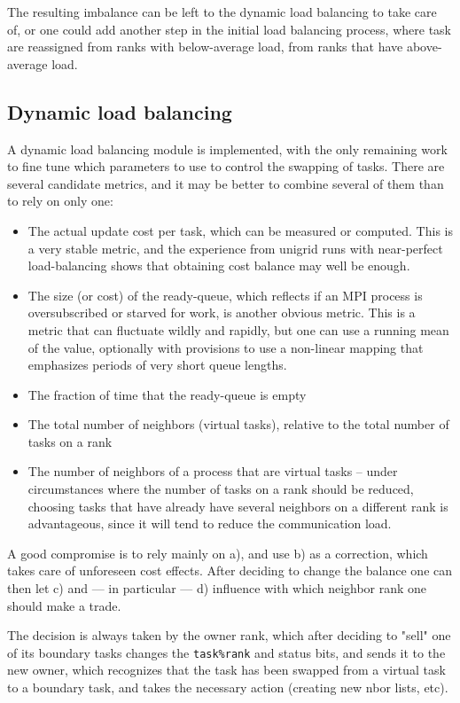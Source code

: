 \documentclass[paper=a4,fontsize=11pt]{scrartcl}
\numberwithin{equation}{section}		%
\numberwithin{figure}{section}			%
\numberwithin{table}{section}				%
\newcommand{\codecolor}{\color{Blue}}
\newcommand{\Code}[1]{{\codecolor\texttt{#1}}}
\begin{document}
The resulting imbalance can be left to the dynamic load balancing to take care of, or one could add another step in the initial load balancing process, where task are reassigned from ranks with below-average load, from ranks that have above-average load.

\subsection{Dynamic load balancing}
A dynamic load balancing module is implemented, with the only remaining work to fine tune which parameters to use to control the swapping of tasks.  There are several candidate metrics, and it may be better to combine several of them than to rely on only one:
\begin{itemize}
    \item[a)] The actual update cost per task, which can be measured or computed.  This is a very stable metric, and the experience from unigrid runs with near-perfect load-balancing shows that obtaining cost balance may well be enough.
    \item[b)] The size (or cost) of the ready-queue, which reflects if an MPI process is oversubscribed or starved for work, is another obvious metric. This is a metric that can fluctuate wildly and rapidly, but one can use a running mean of the value, optionally with provisions to use a non-linear mapping that emphasizes periods of very short queue lengths.
    \item[c)] The fraction of time that the ready-queue is empty
    \item[d)] The total number of neighbors (virtual tasks), relative to the total number of tasks on a rank
    \item[e)] The number of neighbors of a process that are virtual tasks -- under circumstances where the number of tasks on a rank should be reduced, choosing tasks that have already have several neighbors on a different rank is advantageous, since it will tend to reduce the communication load.
\end{itemize}
A good compromise is to rely mainly on a), and use b) as a correction, which takes care of unforeseen cost effects.  After deciding to change the balance one can then let c) and --- in particular --- d) influence with which neighbor rank one should make a trade.

The decision is always taken by the owner rank, which after deciding to "sell" one of its boundary tasks changes the \Code{task\%rank} and status bits, and sends it to the new owner, which recognizes that the task has been swapped from a virtual task to a boundary task, and takes the necessary action (creating new nbor lists, etc).
\end{document}

